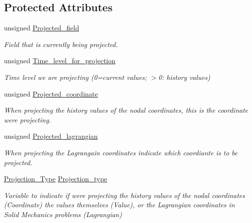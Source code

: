 \subsection*{Protected Attributes}
\begin{DoxyCompactItemize}
\item 
unsigned \hyperlink{classoomph_1_1ProjectableElementBase_aa71079c0f1075ac390708063fd7d2731}{Projected\+\_\+field}
\begin{DoxyCompactList}\small\item\em Field that is currently being projected. \end{DoxyCompactList}\item 
unsigned \hyperlink{classoomph_1_1ProjectableElementBase_a4698e178e500468c0af8c37bd47d0bd3}{Time\+\_\+level\+\_\+for\+\_\+projection}
\begin{DoxyCompactList}\small\item\em Time level we are projecting (0=current values; $>$0\+: history values) \end{DoxyCompactList}\item 
unsigned \hyperlink{classoomph_1_1ProjectableElementBase_ab712be6423145fae3c23e444187db0e2}{Projected\+\_\+coordinate}
\begin{DoxyCompactList}\small\item\em When projecting the history values of the nodal coordinates, this is the coordinate we\textquotesingle{}re projecting. \end{DoxyCompactList}\item 
unsigned \hyperlink{classoomph_1_1ProjectableElementBase_a1034f9a066d1e4116f5b6acf5e5a279c}{Projected\+\_\+lagrangian}
\begin{DoxyCompactList}\small\item\em When projecting the Lagrangain coordinates indicate which coordiante is to be projected. \end{DoxyCompactList}\item 
\hyperlink{classoomph_1_1ProjectableElementBase_aa6b28955725b5626cc4cbf0465f12a9e}{Projection\+\_\+\+Type} \hyperlink{classoomph_1_1ProjectableElementBase_a1081b0f4b3633612639f92d13a187db5}{Projection\+\_\+type}
\begin{DoxyCompactList}\small\item\em Variable to indicate if we\textquotesingle{}re projecting the history values of the nodal coordinates (Coordinate) the values themselves (Value), or the Lagrangian coordinates in Solid Mechanics problems (Lagrangian) \end{DoxyCompactList}\item 

\end{DoxyCompactItemize}
